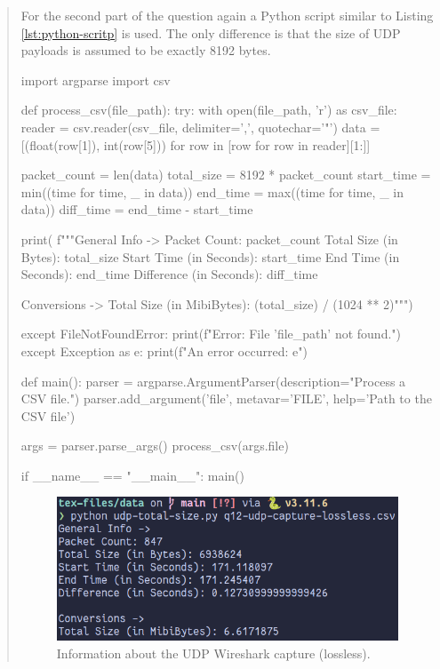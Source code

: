\documentclass{article}
\newenvironment{ans}
{\fbox{Answer}\begin{quote}\nopagebreak}
{\end{quote}}
\begin{document}
\begin{ans}
For the second part of the question again a Python script
similar to Listing \ref{lst:python-scritp} is used. The
only difference is that the size of UDP payloads is assumed
to be exactly 8192 bytes.
\begin{gruvboxlisting}[language=Python, caption={A Python script for computing a
number the total size of a number of maximum size (8192 bytes) UDP packets.}]
import argparse
import csv

def process_csv(file_path): try: with open(file_path, 'r')
as csv_file: reader = csv.reader(csv_file, delimiter=',',
quotechar='"') data = [(float(row[1]), int(row[5])) for row
in [row for row in reader][1:]]

packet_count = len(data) total_size = 8192 * packet_count
start_time = min((time for time, _ in data)) end_time =
max((time for time, _ in data)) diff_time = end_time -
start_time

print( f"""General Info -> Packet Count: {packet_count}
Total Size (in Bytes): {total_size} Start Time (in
Seconds): {start_time} End Time (in Seconds): {end_time}
Difference (in Seconds): {diff_time}

Conversions -> Total Size (in MibiBytes): {(total_size) /
(1024 ** 2)}""")

except FileNotFoundError: print(f"Error: File '{file_path}'
not found.") except Exception as e: print(f"An error
occurred: {e}")

def main(): parser =
argparse.ArgumentParser(description="Process a CSV file.")
parser.add_argument('file', metavar='FILE', help='Path to
the CSV file')

args = parser.parse_args() process_csv(args.file)

if __name__ == "__main__": main()
\end{gruvboxlisting}

\begin{figure}[H]
\centering
\includegraphics[width=13cm]{data/q12-udp-capture-stats.png}
\caption{Information about the UDP Wireshark capture (lossless).}
\label{fig:q12-udp-capture-info}
\end{figure}


\end{ans}
\end{document}
